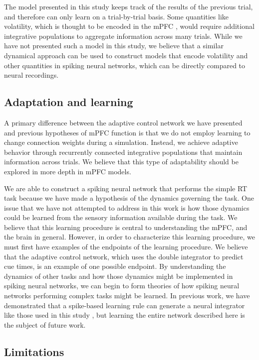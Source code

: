 \documentclass[11pt]{article}
\begin{document}
The model presented in this study keeps track
of the results of the previous trial,
and therefore can only learn
on a trial-by-trial basis.
Some quantities like volatility,
which is thought to be encoded
in the mPFC \cite{Behrens2007},
would require additional integrative
populations to aggregate information
across many trials.
While we have not presented
such a model in this study,
we believe that a similar dynamical approach
can be used to construct models
that encode volatility
and other quantities
in spiking neural networks,
which can be directly compared
to neural recordings.

\subsection{Adaptation and learning}

A primary difference between
the adaptive control network we have presented
and previous hypotheses of mPFC function
is that we do not employ learning
to change connection weights
during a simulation.
Instead, we achieve adaptive behavior
through recurrently connected
integrative populations that
maintain information across trials.
We believe that this type of adaptability
should be explored in more depth in mPFC models.

We are able to construct a spiking neural network
that performs the simple RT task
because we have made a hypothesis of the
dynamics governing the task.
One issue that we have not attempted to address
in this work is how those dynamics
could be learned from the sensory
information available during the task.
We believe that this learning procedure
is central to understanding the mPFC,
and the brain in general.
However, in order to characterize
this learning procedure,
we must first have examples
of the endpoints of the learning procedure.
We believe that
the adaptive control network,
which uses the double integrator
to predict cue times,
is an example of one possible endpoint.
By understanding the dynamics
of other tasks and how those dynamics
might be implemented in spiking neural networks,
we can begin to form theories of
how spiking neural networks
performing complex tasks might be learned.
In previous work, we have demonstrated
that a spike-based learning rule
can generate a neural integrator
like those used in this study \cite{Macneil2011},
but learning the entire network
described here is the subject of future work.

\subsection{Limitations}
\end{document}
